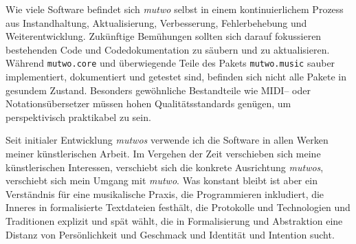 \documentclass[12pt,a4paper,ngerman]{article}
\begin{document}







\bigskip

Wie viele Software befindet sich \emph{mutwo} selbst in einem kontinuierlichem Prozess aus Instandhaltung, Aktualisierung, Verbesserung, Fehlerbehebung und Weiterentwicklung.
Zukünftige Bemühungen sollten sich darauf fokussieren bestehenden Code und Codedokumentation zu säubern und zu aktualisieren.
Während \texttt{mutwo.core} und überwiegende Teile des Pakets \texttt{mutwo.music} sauber implementiert, dokumentiert und getestet sind, befinden sich nicht alle Pakete in gesundem Zustand.
Besonders gewöhnliche Bestandteile wie MIDI-- oder Notationsübersetzer müssen hohen Qualitätsstandards genügen, um perspektivisch praktikabel zu sein.

\bigskip

Seit initialer Entwicklung \emph{mutwos} verwende ich die Software in allen Werken meiner künstlerischen Arbeit.
Im Vergehen der Zeit verschieben sich meine künstlerischen Interessen, verschiebt sich die konkrete Ausrichtung \emph{mutwos}, verschiebt sich mein Umgang mit \emph{mutwo}.
Was konstant bleibt ist aber ein Verständnis für eine musikalische Praxis, die Programmieren inkludiert, die Inneres in formalisierte Textdateien festhält, die Protokolle und Technologien und Traditionen explizit und spät wählt, die in Formalisierung und Abstraktion eine Distanz von Persönlichkeit und Geschmack und Identität und Intention sucht.



%


\newpage

\printbibliography

\newpage

\appendix
\end{document}

